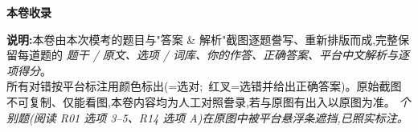 \begin{titlepage}
\begin{tcolorbox}[width=0.84\textwidth, enhanced, colback=cModelBg, colframe=cFix,
  boxrule=0pt, borderline west={3pt}{0pt}{cFix}, arc=3pt, left=14pt, right=14pt, top=8pt, bottom=8pt]
{\bfseries\color{cHead}本卷收录}
\end{tcolorbox}

\vfill
\begin{flushleft}\small\color{gray}
\textbf{说明:}本卷由本次模考的题目与"答案 \& 解析"截图逐题誊写、重新排版而成,完整保留每道题的
\emph{题干 / 原文、选项 / 词库、你的作答、正确答案、平台中文解析与逐项得分}。\\
所有对错按平台标注用颜色标出(=选对; {\color{cWrong}}\,红叉=选错并给出正确答案)。原始截图不可复制、仅能看图,本卷内容均为人工对照誊录,若与原图有出入以原图为准。
\emph{个别题(阅读 R01 选项 3--5、R14 选项 A)在原图中被平台悬浮条遮挡,已照实标注。}
\end{flushleft}
\vspace{4mm}
\ptelegend
\end{titlepage}
